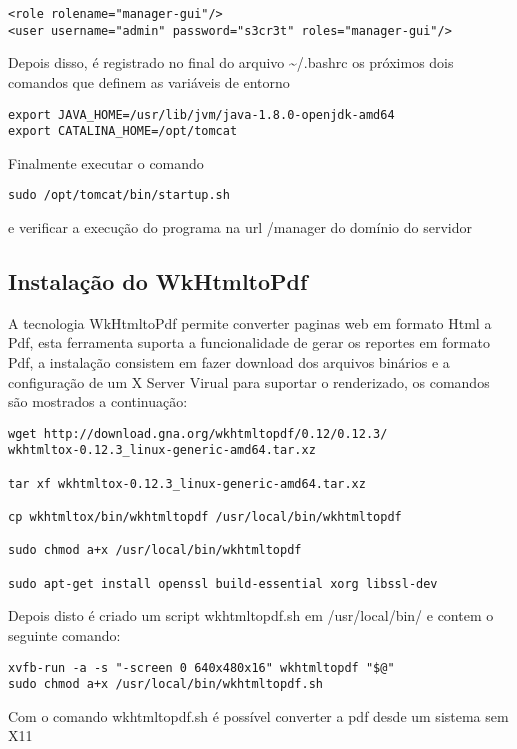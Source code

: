 \begin{lstlisting}
<role rolename="manager-gui"/> 
<user username="admin" password="s3cr3t" roles="manager-gui"/>
\end{lstlisting}
Depois disso, é registrado no final do arquivo \textasciitilde{}/.bashrc
os próximos dois comandos que definem as variáveis de entorno

\begin{lstlisting}
export JAVA_HOME=/usr/lib/jvm/java-1.8.0-openjdk-amd64 
export CATALINA_HOME=/opt/tomcat
\end{lstlisting}
Finalmente executar o comando 

\begin{lstlisting}
sudo /opt/tomcat/bin/startup.sh
\end{lstlisting}
e verificar a execução do programa na url /manager do domínio do servidor

\subsection{Instalação do WkHtmltoPdf}

A tecnologia WkHtmltoPdf permite converter paginas web em formato
Html a Pdf, esta ferramenta suporta a funcionalidade de gerar os reportes
em formato Pdf, a instalação consistem em fazer download dos arquivos
binários e a configuração de um X Server Virual para suportar o renderizado,
os comandos são mostrados a continuação:

\begin{lstlisting}
wget http://download.gna.org/wkhtmltopdf/0.12/0.12.3/
wkhtmltox-0.12.3_linux-generic-amd64.tar.xz

tar xf wkhtmltox-0.12.3_linux-generic-amd64.tar.xz

cp wkhtmltox/bin/wkhtmltopdf /usr/local/bin/wkhtmltopdf

sudo chmod a+x /usr/local/bin/wkhtmltopdf

sudo apt-get install openssl build-essential xorg libssl-dev
\end{lstlisting}
Depois disto é criado um script wkhtmltopdf.sh em /usr/local/bin/
e contem o seguinte comando:

\begin{lstlisting}
xvfb-run -a -s "-screen 0 640x480x16" wkhtmltopdf "$@"
sudo chmod a+x /usr/local/bin/wkhtmltopdf.sh 
\end{lstlisting}
Com o comando wkhtmltopdf.sh é possível converter a pdf desde um sistema
sem X11

